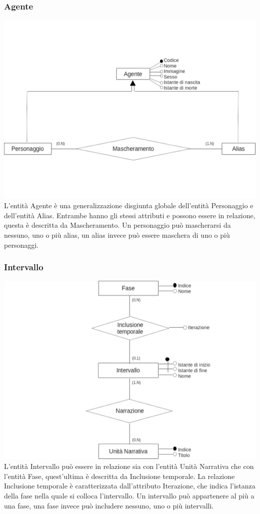 \documentclass{article}
\begin{document}
\subsubsection{Agente}
\includegraphics[width=\linewidth]{agente-scheletro.png}
L'entità Agente è una generalizzazione disgiunta globale dell'entità
Personaggio e dell'entità Alias. Entrambe hanno gli stessi attributi e possono
essere in relazione, questa è descritta da Mascheramento. Un personaggio può
mascherarsi da nessuno, uno o più alias, un alias invece può essere maschera di uno o
più personaggi.
\subsubsection{Intervallo}
\includegraphics[width=\linewidth]{intervallo-scheletro.png}
L'entità Intervallo può essere in relazione sia con l'entità Unità Narrativa che
con l'entità Fase, quest'ultima è descritta da Inclusione temporale. La
relazione Inclusione temporale è caratterizzata dall'attributo Iterazione, che
indica l'istanza della fase nella quale si colloca l'intervallo. Un intervallo
può appartenere al più a una fase, una fase invece può includere nessuno, uno o
più intervalli.
\end{document}
